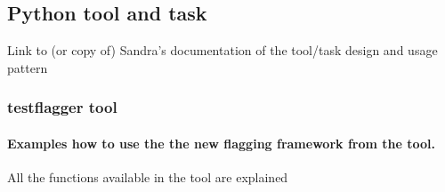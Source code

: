 


\subsection{Python tool and task}

{\green Link to (or copy of) Sandra's documentation of the tool/task design and usage pattern }

\subsubsection{testflagger tool}
\paragraph{Examples how to use the the new flagging framework from the tool.}
All the functions available in the tool are explained

